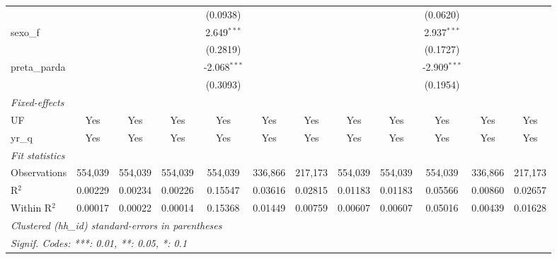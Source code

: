 \begin{table}[htbp]
\begin{tabular}{lccccccccccc}
                                               &               &                &               & (0.0938)       &                &               &                &                & (0.0620)       &                &   \\   
      sexo\_f                                  &               &                &               & 2.649$^{***}$  &                &               &                &                & 2.937$^{***}$  &                &   \\   
                                               &               &                &               & (0.2819)       &                &               &                &                & (0.1727)       &                &   \\   
      preta\_parda                             &               &                &               & -2.068$^{***}$ &                &               &                &                & -2.909$^{***}$ &                &   \\   
                                               &               &                &               & (0.3093)       &                &               &                &                & (0.1954)       &                &   \\   
      \midrule
      \emph{Fixed-effects}\\
      UF                                       & Yes           & Yes            & Yes           & Yes            & Yes            & Yes           & Yes            & Yes            & Yes            & Yes            & Yes\\  
      yr\_q                                    & Yes           & Yes            & Yes           & Yes            & Yes            & Yes           & Yes            & Yes            & Yes            & Yes            & Yes\\  
      \midrule
      \emph{Fit statistics}\\
      Observations                             & 554,039       & 554,039        & 554,039       & 554,039        & 336,866        & 217,173       & 554,039        & 554,039        & 554,039        & 336,866        & 217,173\\  
      R$^2$                                    & 0.00229       & 0.00234        & 0.00226       & 0.15547        & 0.03616        & 0.02815       & 0.01183        & 0.01183        & 0.05566        & 0.00860        & 0.02657\\  
      Within R$^2$                             & 0.00017       & 0.00022        & 0.00014       & 0.15368        & 0.01449        & 0.00759       & 0.00607        & 0.00607        & 0.05016        & 0.00439        & 0.01628\\  
      \midrule \midrule
      \multicolumn{12}{l}{\emph{Clustered (hh\_id) standard-errors in parentheses}}\\
      \multicolumn{12}{l}{\emph{Signif. Codes: ***: 0.01, **: 0.05, *: 0.1}}\\
   \end{tabular}
\end{table}
